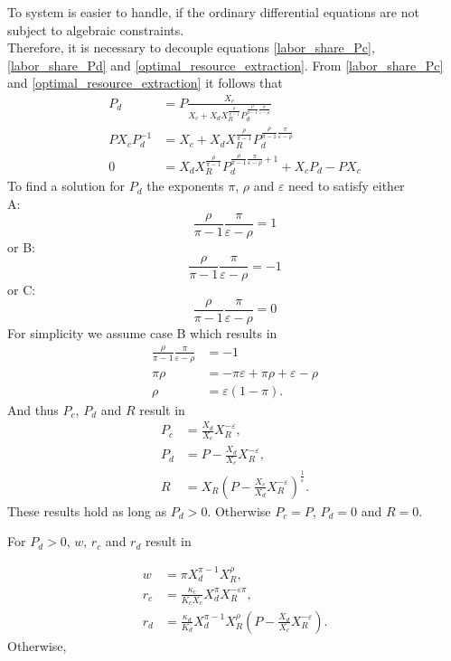 To system is easier to handle, if the ordinary differential equations are not subject to algebraic constraints. \\
Therefore, it is necessary to decouple equations \eqref{labor_share_Pc}, \eqref{labor_share_Pd} and \eqref{optimal_resource_extraction}.
From \eqref{labor_share_Pc} and \eqref{optimal_resource_extraction} it follows that
\begin{align}
	P_d &= P\frac{X_c}{X_c + X_d X_R^{\frac{\rho}{\pi-1}}P_d^{\frac{\rho}{\pi-1}\frac{\pi}{\varepsilon-\rho}}} \\
	P X_c P_d^{-1} &= X_c + X_d X_R^{\frac{\rho}{\pi-1}}P_d^{\frac{\rho}{\pi-1}\frac{\pi}{\varepsilon-\rho}} \\
	0 &= X_d X_R^{\frac{\rho}{\pi-1}}P_d^{\frac{\rho}{\pi-1}\frac{\pi}{\varepsilon-\rho}+1} + X_c P_d - P X_c
\end{align}
To find a solution for $P_d$ the exponents $\pi$, $\rho$ and $\varepsilon$ need to satisfy either \\
A:
\begin{equation}
	\frac{\rho}{\pi-1}\frac{\pi}{\varepsilon-\rho} = 1
\end{equation}
or B:
\begin{equation}
	\frac{\rho}{\pi-1}\frac{\pi}{\varepsilon-\rho}= -1
\end{equation}
or C:
\begin{equation}
	\frac{\rho}{\pi-1}\frac{\pi}{\varepsilon-\rho}= 0
\end{equation}
For simplicity we assume case B which results in
\begin{align}
	\frac{\rho}{\pi-1}\frac{\pi}{\varepsilon-\rho} &= -1 \\
	\pi \rho &= -\pi\varepsilon + \pi\rho + \varepsilon - \rho \\
	\rho &= \varepsilon(1-\pi).
\end{align}
And thus $P_c$, $P_d$ and $R$ result in
\begin{align}
	P_c &= \frac{X_d }{X_c}X_R ^{-\varepsilon}, \\
	P_d &= P - \frac{X_d }{X_c}X_R ^{-\varepsilon}, \\
	R &= X_R \left( P-\frac{X_c}{X_d} X_R^{-\varepsilon} \right)^{\frac{1}{\varepsilon}}.
	\label{input_share_solution_IIb}
\end{align}
These results hold as long as $P_d>0$. Otherwise $P_c = P$, $P_d = 0$ and $R=0$. 

For $P_d>0$, $w$, $r_c$ and $r_d$ result in

\begin{align}
	w &= \pi X_d^{\pi-1} X_R ^{\rho}, \\
	r_c &= \frac{\kappa_c}{K_c X_c}X_d^{\pi}X_R^{-\varepsilon \pi}, \\
	r_d &= \frac{\kappa_d}{K_d}X_d^{\pi-1}X_R^{\rho}\left( P -\frac{X_d}{X_c}X_R^{-\varepsilon}\right).
\end{align}
Otherwise, 


